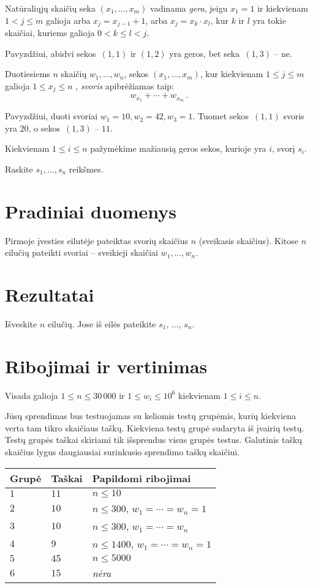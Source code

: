 
\noindent
Natūraliųjų skaičių seka $(x_1,\ldots,x_m)$ vadinama \emph{gera}, jeigu  $x_1 = 1$ ir kiekvienam $1 < j \leq m$ galioja arba $x_j=x_{j-1}+1$, arba $x_j=x_k\cdot x_l$, kur $k$ ir $l$ yra tokie skaičiai, kuriems galioja $0< k\leq l< j$.

Pavyzdžiui, abidvi sekos~$(1,1)$ ir $(1,2)$ yra geros, bet seka~$(1,3)$ -- ne.

Duotiesiems $n$ skaičių $w_1,\ldots,w_n$, sekos $(x_1,\ldots,x_m)$, kur kiekvienam $1\leq j\leq m$
 galioja $1\leq x_j \leq n$ , \emph{svoris} apibrėžiamas taip:
\[ w_{x_1} +\cdots +w_{x_m}\,.\] 

Pavyzdžiui, duoti svoriai $w_1=10,  w_2=42,w_3= 1$. Tuomet sekos~$(1,1)$ svoris yra $20$, o sekos~$(1,3)$ -- $11$.

Kiekvienam $1\leq i\leq n$ pažymėkime mažiausią geros sekos, kurioje yra $i$, svorį $s_i$.

Raskite $s_1,\ldots ,s_n$ reikšmes.

\section*{Pradiniai duomenys}

Pirmoje įvesties eilutėje pateiktas svorių skaičius $n$ (sveikasis skaičius).
Kitose $n$ eilučių pateikti svoriai -- sveikieji skaičiai $w_1, \ldots, w_n$.

\section*{Rezultatai}

Išveskite $n$ eilučių. Jose iš eilės pateikite $s_1$, $\ldots$, $s_n$.

\section*{Ribojimai ir vertinimas}

Visada galioja
$1\leq n \leq 30\,000$ %
ir
$1\leq w_i \leq 10^6$ kiekvienam $1\leq i \leq n$.%

Jūsų sprendimas bus testuojamas su keliomis testų grupėmis, kurių kiekviena verta tam tikro skaičiaus taškų.
Kiekviena testų grupė sudaryta iš įvairių testų.
Testų grupės taškai skiriami tik išsprendus visus grupės testus.
Galutinis taškų skaičius lygus daugiausiai surinkusio sprendimo taškų skaičiui.

\medskip
\begin{tabular}{lll}
Grupė & Taškai & Papildomi ribojimai \\\hline
$1$   & $11$ & $n\leq 10$ \\
$2$   & $10$ & $n\leq 300$, $w_1=\cdots=w_n = 1$ \\
$3$   & $10$ & $n\leq 300$, $w_1=\cdots=w_n$ \\ %
$4$   & $9$ & $n\leq 1400$, $w_1=\cdots=w_n = 1$ \\
$5$   & $45$ & $n\leq 5000$\\
$6$   & $15$ & \emph{nėra}
\end{tabular}
